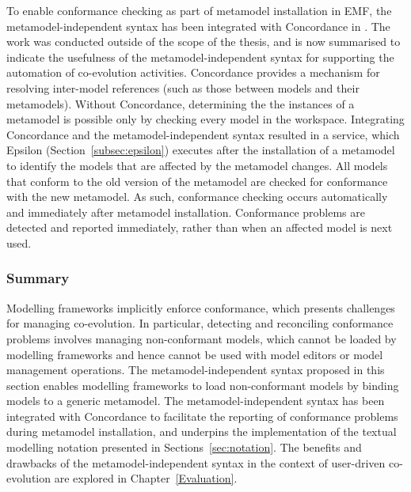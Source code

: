 To enable conformance checking as part of metamodel installation in EMF, the metamodel-independent syntax has been integrated with Concordance in \cite{rose10concordance}. The work was conducted outside of the scope of the thesis, and is now summarised to indicate the usefulness of the metamodel-independent syntax for supporting the automation of co-evolution activities. Concordance provides a mechanism for resolving inter-model references (such as those between models and their metamodels). Without Concordance, determining the the instances of a metamodel is possible only by checking every model in the workspace. Integrating Concordance and the metamodel-independent syntax resulted in a service, which Epsilon (Section~\ref{subsec:epsilon}) executes after the installation of a metamodel to identify the models that are affected by the metamodel changes. All models that conform to the old version of the metamodel are checked for conformance with the new metamodel. As such, conformance checking occurs automatically and immediately after metamodel installation. Conformance problems are detected and reported immediately, rather than when an affected model is next used.

\subsubsection{Summary}
Modelling frameworks implicitly enforce conformance, which presents challenges for managing co-evolution. In particular, detecting and reconciling conformance problems involves managing non-conformant models, which cannot be loaded by modelling frameworks and hence cannot be used with model editors or model management operations. The metamodel-independent syntax proposed in this section enables modelling frameworks to load non-conformant models by binding models to a generic metamodel. The metamodel-independent syntax has been integrated with Concordance \cite{rose10concordance} to facilitate the reporting of conformance problems during metamodel installation, and underpins the implementation of the textual modelling notation presented in Sections~\ref{sec:notation}. The benefits and drawbacks of the metamodel-independent syntax in the context of user-driven co-evolution are explored in Chapter~\ref{Evaluation}. 
